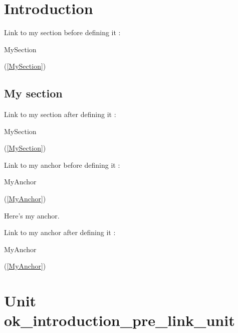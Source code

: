 \documentclass{report}
\begin{document}
\newlength{\tmplength}
\chapter{Introduction}
Link to my section before defining it : \begin{ttfamily}MySection\end{ttfamily}(\ref{MySection})

\section{My section}


Link to my section after defining it : \begin{ttfamily}MySection\end{ttfamily}(\ref{MySection})

Link to my anchor before defining it : \begin{ttfamily}MyAnchor\end{ttfamily}(\ref{MyAnchor})

 Here's my anchor.

Link to my anchor after defining it : \begin{ttfamily}MyAnchor\end{ttfamily}(\ref{MyAnchor})\chapter{Unit ok{\_}introduction{\_}pre{\_}link{\_}unit}
\end{document}
